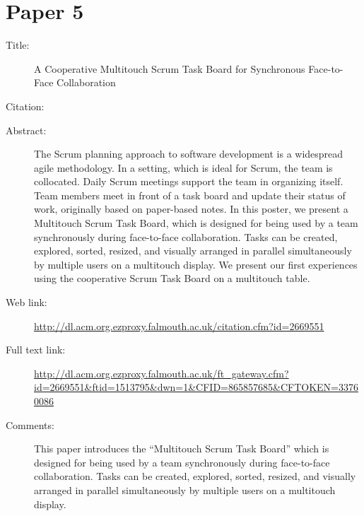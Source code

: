 \documentclass{scrartcl}
\begin{document}
\section*{Paper 5}
\begin{description}
\item[Title:] A Cooperative Multitouch Scrum Task Board for Synchronous Face-to-Face Collaboration
\item[Citation:] \cite{Multitouch}
\item[Abstract:] The Scrum planning approach to software development is a widespread agile methodology. In a setting, which is ideal for Scrum, the team is collocated. Daily Scrum meetings support the team in organizing itself. Team members meet in front of a task board and update their status of work, originally based on paper-based notes. In this poster, we present a Multitouch Scrum Task Board, which is designed for being used by a team synchronously during face-to-face collaboration. Tasks can be created, explored, sorted, resized, and visually arranged in parallel simultaneously by multiple users on a multitouch display. We present our first experiences using the cooperative Scrum Task Board on a multitouch table.
\item[Web link:] \url{http://dl.acm.org.ezproxy.falmouth.ac.uk/citation.cfm?id=2669551}
\item[Full text link:] \url{http://dl.acm.org.ezproxy.falmouth.ac.uk/ft_gateway.cfm?id=2669551&ftid=1513795&dwn=1&CFID=865857685&CFTOKEN=33760086}
\item[Comments:] This paper introduces the “Multitouch Scrum Task Board” which is designed for being used by a team synchronously during face-to-face collaboration. Tasks can be created, explored, sorted, resized, and visually arranged in parallel simultaneously by multiple users on a multitouch display.
\end{description}
\end{document}
